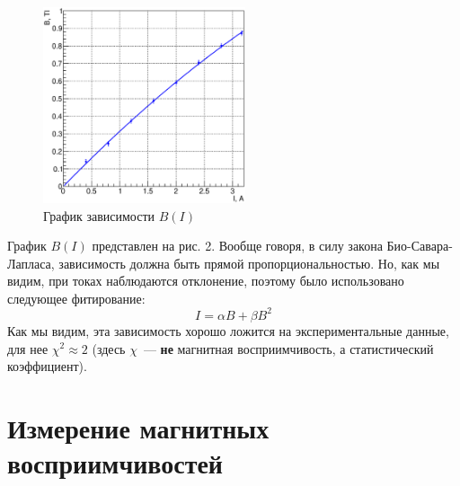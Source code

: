 \documentclass[12pt,a4paper]{article}
\begin{document}
\begin{figure}
\centering\includegraphics[width = 0.53\textwidth]{Plt1}
\captionsetup{justification = centering}
\caption{График зависимости $B(I)$\label{Fig2}}
\end{figure}
График $B(I)$ представлен на рис. 2. Вообще говоря, в силу закона Био-Савара-Лапласа, зависимость должна быть прямой пропорциональностью. Но, как мы видим, при токах наблюдаются отклонение, поэтому было использовано следующее фитирование:
\begin{equation}
I = \alpha B+\beta B^2
\end{equation}
Как мы видим, эта зависимость хорошо ложится на экспериментальные данные, для нее $\chi^2 \approx 2$ (здесь $\chi$~--- \textbf{не} магнитная восприимчивость, а статистический коэффициент).
\section{Измерение магнитных восприимчивостей}
\end{document}
